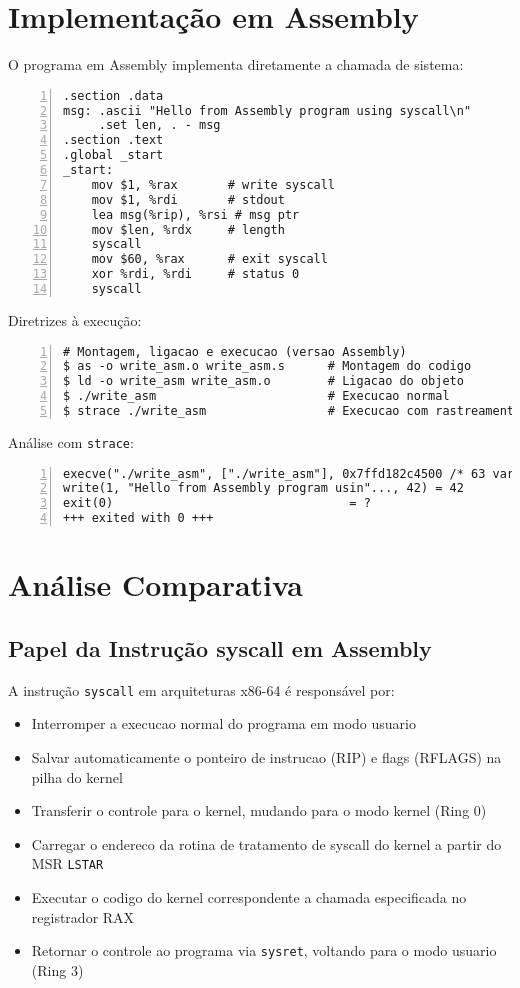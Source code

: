 \documentclass[10pt,a4paper]{article}
\begin{document}
\section{Implementação em Assembly}

O programa em Assembly implementa diretamente a chamada de sistema:

\begin{lstlisting}[language={[x86masm]Assembler}, frame=single, numbers=left]
.section .data
msg: .ascii "Hello from Assembly program using syscall\n"
     .set len, . - msg
.section .text
.global _start
_start:
    mov $1, %rax       # write syscall
    mov $1, %rdi       # stdout
    lea msg(%rip), %rsi # msg ptr
    mov $len, %rdx     # length
    syscall
    mov $60, %rax      # exit syscall
    xor %rdi, %rdi     # status 0
    syscall
\end{lstlisting}

Diretrizes à execução:

\begin{lstlisting}[frame=single, numbers=left]
# Montagem, ligacao e execucao (versao Assembly)
$ as -o write_asm.o write_asm.s      # Montagem do codigo
$ ld -o write_asm write_asm.o        # Ligacao do objeto
$ ./write_asm                        # Execucao normal
$ strace ./write_asm                 # Execucao com rastreamento
\end{lstlisting}

Análise com \texttt{strace}:

\begin{lstlisting}[frame=single, numbers=left]
execve("./write_asm", ["./write_asm"], 0x7ffd182c4500 /* 63 vars */) = 0
write(1, "Hello from Assembly program usin"..., 42) = 42
exit(0)                                 = ?
+++ exited with 0 +++
\end{lstlisting}

\section{Análise Comparativa}

\subsection{Papel da Instrução syscall em Assembly}

A instrução \texttt{syscall} em arquiteturas x86-64 é responsável por:
\begin{itemize}
  \item Interromper a execucao normal do programa em modo usuario
  \item Salvar automaticamente o ponteiro de instrucao (RIP) e flags (RFLAGS) na pilha do kernel
  \item Transferir o controle para o kernel, mudando para o modo kernel (Ring 0)
  \item Carregar o endereco da rotina de tratamento de syscall do kernel a partir do MSR \texttt{LSTAR}
  \item Executar o codigo do kernel correspondente a chamada especificada no registrador RAX
  \item Retornar o controle ao programa via \texttt{sysret}, voltando para o modo usuario (Ring 3)
\end{itemize}
\end{document}
